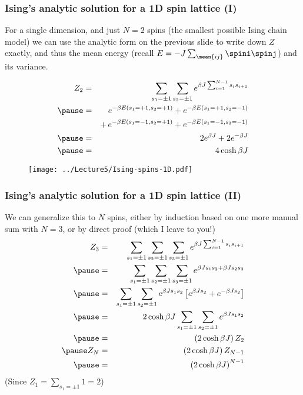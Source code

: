 \documentclass[hyperref={colorlinks=true}]{beamer}
\begin{document}
\begin{frame}%
  \frametitle{Ising's analytic solution for a 1D spin lattice (I)}


    For a single dimension, and just $N=2$ spins (the smallest possible Ising chain model) we can use the analytic form on the previous slide to write down $Z$ exactly, and thus the mean energy (recall $E=-J\sum_{\mean{ij}}\spini \spinj$) and its variance. \pause

  \begin{eqnarray}
    Z_2 &=& \sum_{s_1 = \pm1} \sum_{s_2 = \pm1} e^{ \beta J\sum_{i=1}^{N-1} s_i s_{i+1} }  \\ \pause
        &=& e^{ -\beta E(s_1 = +1, s_2 =+1) } + e^{ -\beta E(s_1 = +1, s_2 =-1) } \nonumber  \\ 
        & & +\, e^{ -\beta E(s_1 = -1, s_2 =+1) } + e^{ -\beta E(s_1 = -1, s_2 =-1) }  \\ \pause
        &=& 2 e^{ \beta J } + 2 e^{ -\beta J }  \\ \pause
        &=& 4 \cosh \beta J
  \end{eqnarray}

  \begin{figure}
    \centering
    \texttt{[image: ../Lecture5/Ising-spins-1D.pdf]}
  \end{figure}

\end{frame}


\begin{frame}%
  \frametitle{Ising's analytic solution for a 1D spin lattice (II)}

    We can generalize this to $N$ spins, either by induction based on one more manual sum with $N=3$, or by direct proof (which I leave to you!)
%
  \begin{eqnarray}
    Z_3 &=& \sum_{s_1 = \pm1} \sum_{s_2 = \pm1} \sum_{s_3 = \pm1} e^{ \beta J\sum_{i=1}^{N-1} s_i s_{i+1} } \\ \pause
        &=& \sum_{s_1 = \pm1} \sum_{s_2 = \pm1} \sum_{s_3 = \pm1} e^{ \beta J s_1 s_2 + \beta J s_2 s_3 } \\ \pause
        &=& \sum_{s_1 = \pm1} \sum_{s_2 = \pm1} e^{ \beta J s_1 s_2} \left[ e^{ \beta J s_2 } + e^{- \beta J s_2 } \right] \\ \pause
        &=& 2 \cosh \beta J \sum_{s_1 = \pm1} \sum_{s_2 = \pm1} e^{ \beta J s_1 s_2}  \\ \pause
        &=& \left(2 \cosh \beta J\right) Z_2 \\ \pause
    Z_N &=& \left(2 \cosh \beta J\right) Z_{N-1} \\ \pause
        &=& \left(2 \cosh \beta J\right)^{N-1}
  \end{eqnarray}
  (Since $Z_1 = \sum_{s_1 = \pm1} 1 = 2$)
  
\end{frame}
\end{document}
